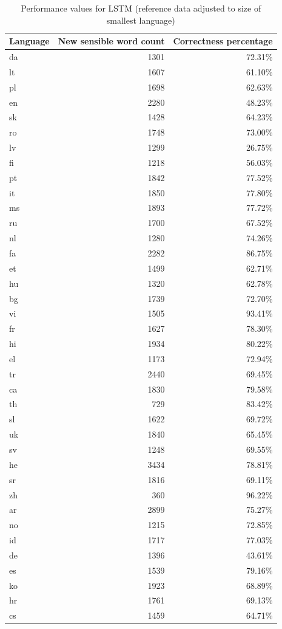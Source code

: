 \documentclass[11pt,a4paper,twoside,openright]{scrbook}
\begin{document}
\begin{table}[h]
\centering
\caption{Performance values for LSTM (reference data adjusted to size of smallest language)}
\label{table:lstm}
\begin{tabular}{lrr}
\textbf{Language} & \textbf{New sensible word count} & \textbf{Correctness percentage} \\ \hline \hline
da & 1301 & 72.31\% \\ \hline
lt & 1607 & 61.10\% \\ \hline
pl & 1698 & 62.63\% \\ \hline
en & 2280 & 48.23\% \\ \hline
sk & 1428 & 64.23\% \\ \hline
ro & 1748 & 73.00\% \\ \hline
lv & 1299 & 26.75\% \\ \hline
fi & 1218 & 56.03\% \\ \hline
pt & 1842 & 77.52\% \\ \hline
it & 1850 & 77.80\% \\ \hline
ms & 1893 & 77.72\% \\ \hline
ru & 1700 & 67.52\% \\ \hline
nl & 1280 & 74.26\% \\ \hline
fa & 2282 & 86.75\% \\ \hline
et & 1499 & 62.71\% \\ \hline
hu & 1320 & 62.78\% \\ \hline
bg & 1739 & 72.70\% \\ \hline
vi & 1505 & 93.41\% \\ \hline
fr & 1627 & 78.30\% \\ \hline
hi & 1934 & 80.22\% \\ \hline
el & 1173 & 72.94\% \\ \hline
tr & 2440 & 69.45\% \\ \hline
ca & 1830 & 79.58\% \\ \hline
th & 729 & 83.42\% \\ \hline
sl & 1622 & 69.72\% \\ \hline
uk & 1840 & 65.45\% \\ \hline
sv & 1248 & 69.55\% \\ \hline
he & 3434 & 78.81\% \\ \hline
sr & 1816 & 69.11\% \\ \hline
zh & 360 & 96.22\% \\ \hline
ar & 2899 & 75.27\% \\ \hline
no & 1215 & 72.85\% \\ \hline
id & 1717 & 77.03\% \\ \hline
de & 1396 & 43.61\% \\ \hline
es & 1539 & 79.16\% \\ \hline
ko & 1923 & 68.89\% \\ \hline
hr & 1761 & 69.13\% \\ \hline
cs & 1459 & 64.71\% \\ 
\end{tabular}
\end{table}
\end{document}
